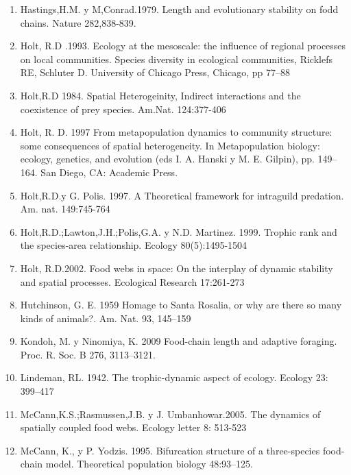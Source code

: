 \documentclass[a4paper,11pt]{article}
\begin{document}
\begin{enumerate}
\item Hastings,H.M. y M,Conrad.1979. Length and evolutionary stability on fodd chains. Nature 282,838-839.\\
\item Holt, R.D .1993. Ecology at the mesoscale: the influence of regional processes on local communities. Species diversity in ecological communities, Ricklefs RE, Schluter D. University of Chicago Press, Chicago, pp 77–88\\
\item Holt,R.D 1984. Spatial Heterogeinity, Indirect interactions and the coexistence of prey species. Am.Nat. 124:377-406\\
\item Holt, R. D. 1997 From metapopulation dynamics to community structure: some consequences of spatial heterogeneity. In Metapopulation biology: ecology, genetics, and evolution (eds I. A. Hanski y M. E. Gilpin), pp. 149–164. San Diego, CA: Academic Press.\\
\item Holt,R.D.y G. Polis. 1997. A Theoretical framework for intraguild predation. Am. nat. 149:745-764\\
\item Holt,R.D.;Lawton,J.H.;Polis,G.A. y N.D. Martinez. 1999. Trophic rank and the species-area relationship. Ecology 80(5):1495-1504\\
\item Holt, R.D.2002. Food webs in space: On the interplay of dynamic stability and spatial processes. Ecological Research 17:261-273\\
\item Hutchinson, G. E. 1959 Homage to Santa Rosalia, or why are there so many kinds of animals?. Am. Nat. 93, 145–159\\
\item Kondoh, M. y Ninomiya, K. 2009 Food-chain length and adaptive foraging. Proc. R. Soc. B 276, 3113–3121.\\
\item Lindeman, RL. 1942. The trophic-dynamic aspect of ecology. Ecology 23: 399–417\\
\item McCann,K.S.;Rasmussen,J.B. y J. Umbanhowar.2005. The dynamics of spatially coupled food webs. Ecology letter 8: 513-523\\
\item McCann, K., y P. Yodzis. 1995. Bifurcation structure of a three-species food-chain model. Theoretical population biology 48:93–125. \\ 

\end{enumerate}
\end{document}

